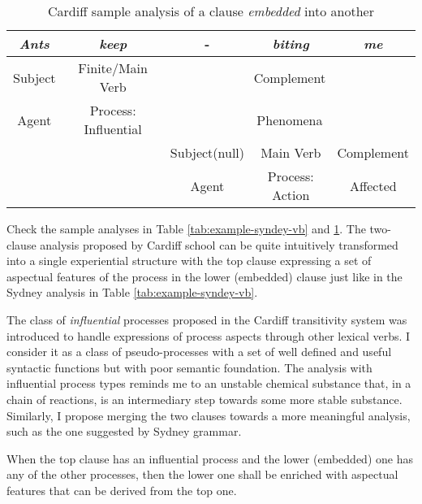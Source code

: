 \begin{table}[H]
	\centering
	\begin{tabular}{|c|c|c|c|c|}
		\hline
		{\it Ants} & {\it keep}          & -             & {\it biting}    & {\it me}   \\ \hline
		Subject    & Finite/Main Verb           & \multicolumn{3}{c|}{Complement}              \\ \hline
		Agent      & Process: Influential & \multicolumn{3}{c|}{Phenomena}               \\ \hline
		\multicolumn{2}{|c|}{}           & Subject(null) & Main Verb       & Complement \\ \hline
		\multicolumn{2}{|c|}{}           & Agent         & Process: Action & Affected   \\ \hline
	\end{tabular}
	\caption{Cardiff sample analysis of a clause \textit{embedded} into another}
	\label{tab:example-cardiff-vb}
\end{table}

Check the sample analyses in Table \ref{tab:example-syndey-vb} and \ref{tab:example-cardiff-vb}. The two-clause analysis proposed by Cardiff school can be quite intuitively transformed into a single experiential structure with the top clause expressing a set of aspectual features of the process in the lower (embedded) clause just like in the Sydney analysis in Table \ref{tab:example-syndey-vb}. 

The class of \textit{influential} processes proposed in the Cardiff transitivity system was introduced to handle expressions of process aspects through other lexical verbs. I consider it as a class of pseudo-processes with a set of well defined and useful syntactic functions but with poor semantic foundation. The analysis with influential process types reminds me to an unstable chemical substance that, in a chain of reactions, is an intermediary step towards some more stable substance. Similarly, I propose merging the two clauses towards a more meaningful analysis, such as the one suggested by Sydney grammar. 

\begin{generalization} \label{def:merging-influential}
	When the top clause has an influential process and the lower (embedded) one has any of the other processes, then the lower one shall be enriched with aspectual features that can be derived from the top one.
\end{generalization}

